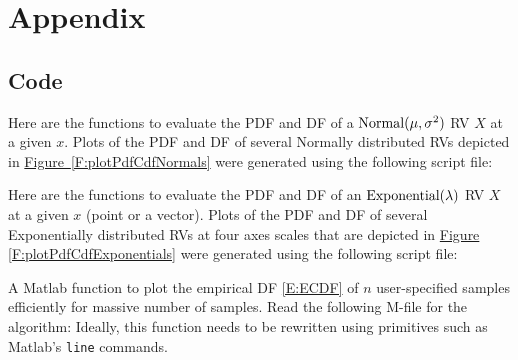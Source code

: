 \chapter{Appendix}
\section{Code}
\begin{labwork}\label{Mf: NormalCdfPdf}
Here are the functions to evaluate the PDF and DF of a $\mbox{{\rm Normal}}(\mu,\sigma^2)$ RV $X$ at a given $x$.
{}
{}
Plots of the PDF and DF of several Normally distributed RVs depicted in \hyperref[F:plotPdfCdfNormals]{Figure~\ref*{F:plotPdfCdfNormals}} were generated using the following script file:
{}
\end{labwork}

\begin{labwork}\label{Mf:ExponentialPdfCdf}
Here are the functions to evaluate the PDF and DF of an $\mbox{{\rm Exponential}}(\lambda)$ RV $X$ at a  given $x$ (point or a vector).
{}
{}
Plots of the PDF and DF of several Exponentially distributed RVs at four axes scales that are depicted in \hyperref[F:plotPdfCdfExponentials]{Figure \ref*{F:plotPdfCdfExponentials}} were generated using the following script file:
{}
\end{labwork}


\begin{labwork}\label{Mf:ECDF}
A {\sc Matlab} function to plot the empirical DF \eqref{E:ECDF} of $n$ user-specified samples efficiently for massive number of samples.  Read the following M-file for the algorithm:
{}
Ideally, this function needs to be rewritten using primitives such as {\sc Matlab}'s {\tt line} commands.
\end{labwork}


